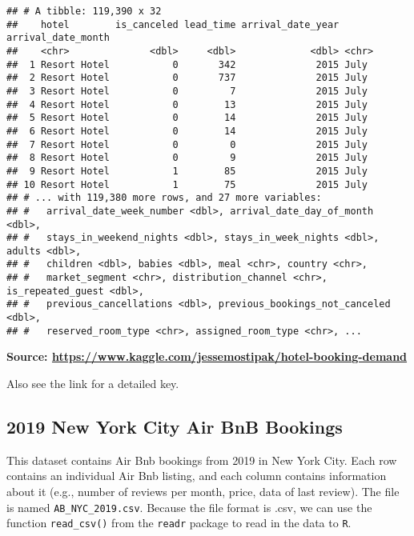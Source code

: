 \documentclass[
]{article}
\begin{document}
\begin{verbatim}
## # A tibble: 119,390 x 32
##    hotel        is_canceled lead_time arrival_date_year arrival_date_month
##    <chr>              <dbl>     <dbl>             <dbl> <chr>             
##  1 Resort Hotel           0       342              2015 July              
##  2 Resort Hotel           0       737              2015 July              
##  3 Resort Hotel           0         7              2015 July              
##  4 Resort Hotel           0        13              2015 July              
##  5 Resort Hotel           0        14              2015 July              
##  6 Resort Hotel           0        14              2015 July              
##  7 Resort Hotel           0         0              2015 July              
##  8 Resort Hotel           0         9              2015 July              
##  9 Resort Hotel           1        85              2015 July              
## 10 Resort Hotel           1        75              2015 July              
## # ... with 119,380 more rows, and 27 more variables:
## #   arrival_date_week_number <dbl>, arrival_date_day_of_month <dbl>,
## #   stays_in_weekend_nights <dbl>, stays_in_week_nights <dbl>, adults <dbl>,
## #   children <dbl>, babies <dbl>, meal <chr>, country <chr>,
## #   market_segment <chr>, distribution_channel <chr>, is_repeated_guest <dbl>,
## #   previous_cancellations <dbl>, previous_bookings_not_canceled <dbl>,
## #   reserved_room_type <chr>, assigned_room_type <chr>, ...
\end{verbatim}

\textbf{Source:
\url{https://www.kaggle.com/jessemostipak/hotel-booking-demand}}

Also see the link for a detailed key.

\hypertarget{new-york-city-air-bnb-bookings}{%
\subsection{2019 New York City Air BnB
Bookings}\label{new-york-city-air-bnb-bookings}}

This dataset contains Air Bnb bookings from 2019 in New York City. Each
row contains an individual Air Bnb listing, and each column contains
information about it (e.g., number of reviews per month, price, data of
last review). The file is named \texttt{AB\_NYC\_2019.csv}. Because the
file format is .csv, we can use the function \texttt{read\_csv()} from
the \texttt{readr} package to read in the data to \texttt{R}.
\end{document}
